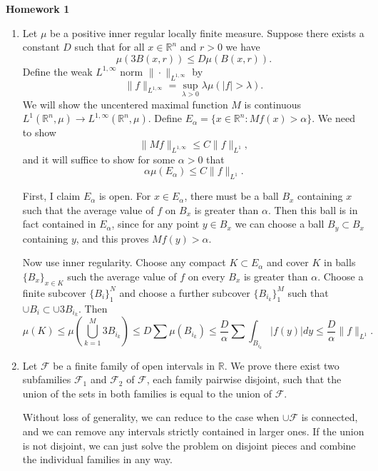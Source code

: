 \documentclass[11pt, reqno]{article}
\theoremstyle{plain}
\theoremstyle{definition}
\theoremstyle{remark}
\newcommand{\RR}{\mathbb{R}}
\begin{document}
\topmargin=-40pt
\renewcommand{\headrulewidth}{1pt}
\renewcommand{\headsep}{20pt}
\thispagestyle{fancy}

{\Huge \bfseries \noindent Homework 1}

\begin{enumerate}
    \item[2.1.1.a] Let $\mu$ be a positive inner regular locally finite measure. Suppose there exists
    a constant $D$ such that for all $x \in \RR^n$ and $r > 0$ we have
    \[
        \mu(3B(x,r)) \leq D \mu(B(x,r)).
    \]
    Define the weak $L^{1,\infty}$ norm $\|\cdot\|_{L^{1, \infty}}$ by
    \[
        \|f\|_{L^{1,\infty}} = \sup_{\lambda > 0}\lambda\mu({|f| > \lambda}).
    \]
    We will show the uncentered maximal function $M$ is continuous $L^1(\RR^n, \mu) \to L^{1,\infty}(\RR^n,\mu)$.
    Define $E_\alpha = \{x \in \RR^n: Mf(x) > \alpha\}$. We need to show
    \[
        \|Mf\|_{L^{1,\infty}} \leq C\|f\|_{L^1},
    \]
    and it will suffice to show for some $\alpha > 0$ that
    \[
        \alpha\mu(E_\alpha) \leq C\|f\|_{L^1}.
    \]

    First, I claim $E_\alpha$ is open. For $x \in E_\alpha$, there must be 
    a ball $B_x$ containing $x$ such that the average value of $f$ on $B_x$ is greater than $\alpha$. Then this ball 
    is in fact contained in $E_\alpha$, since for any point $y \in B_x$ we can choose a ball $B_y \subset B_x$ containing
    $y$, and this proves $Mf(y) > \alpha$. 

    Now use inner regularity. Choose any compact $K \subset E_\alpha$ and cover $K$ in balls $\{B_x\}_{x \in K}$ 
    such the average value of $f$ on every $B_x$ is greater than $\alpha$. Choose a finite subcover $\{B_i\}_1^N$
    and choose a further subcover $\{B_{i_k}\}_1^M$ such that $\cup B_i \subset \cup 3 B_{i_k}$. Then
    \[
        \mu(K) \leq \mu\left(\bigcup_{k = 1}^M 3 B_{i_k}\right) \leq D \sum \mu(B_{i_k}) \leq \frac{D}{\alpha} \sum \int_{B_{i_k}} |f(y)|dy \leq \frac{D}{\alpha}\|f\|_{L^1}.
    \]

    \item[2.1.2.a] Let $\mathscr{F}$ be a finite family of open intervals in $\RR$. We prove there exist two subfamilies $\mathscr{F}_1$ and $\mathscr{F}_2$
    of $\mathscr{F}$, each family pairwise disjoint, such that the union of the sets in both families is equal to the union of $\mathscr{F}$.

    Without loss of generality, we can reduce to the case when $\cup \mathscr{F}$ is connected, and we can remove any intervals
    strictly contained in larger ones. If the union is not disjoint, we can just solve the problem on disjoint pieces and combine
    the individual families in any way. 


\end{enumerate}
\end{document}
